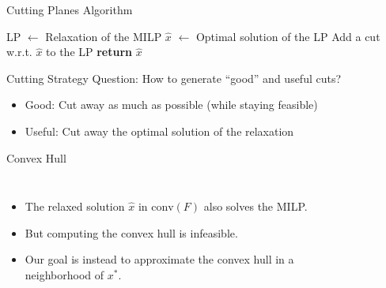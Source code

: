 \begin{frame}{Cutting Planes Algorithm}
     \begin{algorithmic}[1]
     \State LP $\gets$ Relaxation of the MILP
     \Repeat
    	\State $\hat{x}$ $\gets$ Optimal solution of the LP 
    		\State Add a cut w.r.t. $\hat{x}$ to the LP
    	\EndIf 
    \State \textbf{return} $\hat{x}$
   \end{algorithmic}
\end{frame}

\begin{frame}[c]{Cutting Strategy}
\centering\large
	Question: How to generate ``good'' and useful cuts?
	\begin{itemize}[<+(1)->]
	\item Good: Cut away as much as possible (while staying feasible)
	\item Useful: Cut away the optimal solution of the relaxation
	\end{itemize}
\end{frame}

\begin{frame}{Convex Hull}
\begin{columns}
\begin{itemize}
\item The relaxed solution $\hat{x}$ in $\text{conv}(F)$ also solves the MILP.
\item But computing the convex hull is infeasible. %
\item Our goal is instead to approximate the convex hull in a neighborhood of $x^*$.
\end{itemize}

\begin{figure}[p]
        \centering
        
    \end{figure}
\end{columns}
\end{frame}

